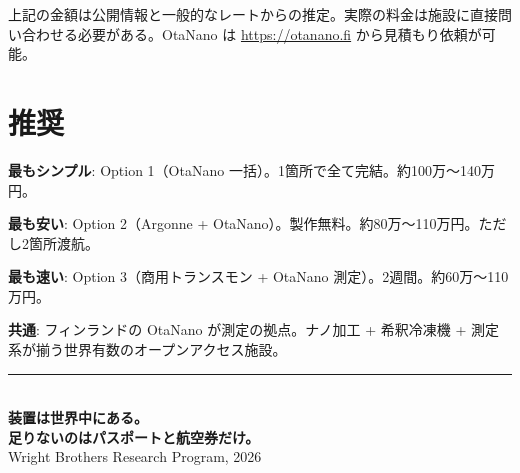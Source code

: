 \documentclass[12pt,a4paper]{article}
\begin{document}
\begin{honestbox}[施設利用料は「概算」]
上記の金額は公開情報と一般的なレートからの推定。実際の料金は施設に直接問い合わせる必要がある。OtaNano は \url{https://otanano.fi} から見積もり依頼が可能。
\end{honestbox}

\section{推奨}

\begin{costbox}[結論]
\textbf{最もシンプル}: Option 1（OtaNano 一括）。1箇所で全て完結。約100万〜140万円。

\textbf{最も安い}: Option 2（Argonne + OtaNano）。製作無料。約80万〜110万円。ただし2箇所渡航。

\textbf{最も速い}: Option 3（商用トランスモン + OtaNano 測定）。2週間。約60万〜110万円。

\textbf{共通}: フィンランドの OtaNano が測定の拠点。ナノ加工 + 希釈冷凍機 + 測定系が揃う世界有数のオープンアクセス施設。
\end{costbox}

\vfill

\begin{center}
\rule{10cm}{0.4pt}\\[0.5cm]
{\Large\bfseries 装置は世界中にある。}\\[0.2cm]
{\Large\bfseries 足りないのはパスポートと航空券だけ。}\\[0.3cm]
{\small Wright Brothers Research Program, 2026}
\end{center}
\end{document}
